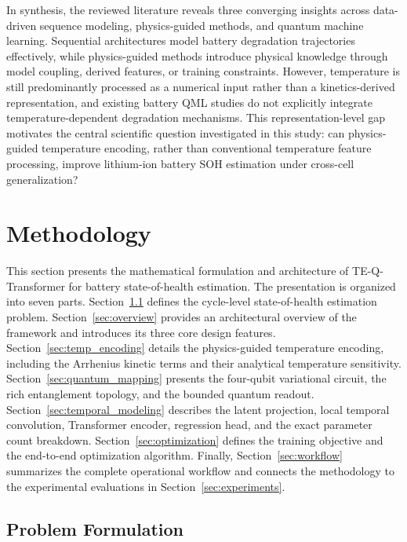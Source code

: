 \documentclass[a4paper,fleqn]{cas-sc}
\begin{document}
In synthesis, the reviewed literature reveals three converging insights across data-driven sequence modeling, physics-guided methods, and quantum machine learning. Sequential architectures model battery degradation trajectories effectively, while physics-guided methods introduce physical knowledge through model coupling, derived features, or training constraints. However, temperature is still predominantly processed as a numerical input rather than a kinetics-derived representation, and existing battery QML studies do not explicitly integrate temperature-dependent degradation mechanisms. This representation-level gap motivates the central scientific question investigated in this study: can physics-guided temperature encoding, rather than conventional temperature feature processing, improve lithium-ion battery SOH estimation under cross-cell generalization?













\section{Methodology}\label{sec:method}

This section presents the mathematical formulation and architecture of TE-Q-Transformer for battery state-of-health estimation. The presentation is organized into seven parts. Section~\ref{sec:problem} defines the cycle-level state-of-health estimation problem. Section~\ref{sec:overview} provides an architectural overview of the framework and introduces its three core design features. Section~\ref{sec:temp_encoding} details the physics-guided temperature encoding, including the Arrhenius kinetic terms and their analytical temperature sensitivity. Section~\ref{sec:quantum_mapping} presents the four-qubit variational circuit, the rich entanglement topology, and the bounded quantum readout. Section~\ref{sec:temporal_modeling} describes the latent projection, local temporal convolution, Transformer encoder, regression head, and the exact parameter count breakdown. Section~\ref{sec:optimization} defines the training objective and the end-to-end optimization algorithm. Finally, Section~\ref{sec:workflow} summarizes the complete operational workflow and connects the methodology to the experimental evaluations in Section~\ref{sec:experiments}.

\subsection{Problem Formulation}\label{sec:problem}
\end{document}
